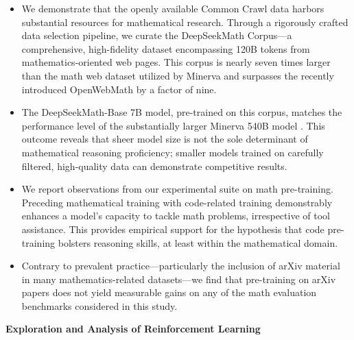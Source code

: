 \begin{itemize}[topsep=0pt]
    \item We demonstrate that the openly available Common Crawl data harbors substantial resources for mathematical research. Through a rigorously crafted data selection pipeline, we curate the DeepSeekMath Corpus—a comprehensive, high-fidelity dataset encompassing 120B tokens from mathematics-oriented web pages. This corpus is nearly seven times larger than the math web dataset utilized by Minerva \citep{minerva} and surpasses the recently introduced OpenWebMath \citep{openwebmath} by a factor of nine.

    \item The DeepSeekMath-Base 7B model, pre-trained on this corpus, matches the performance level of the substantially larger Minerva 540B model \citep{minerva}. This outcome reveals that sheer model size is not the sole determinant of mathematical reasoning proficiency; smaller models trained on carefully filtered, high-quality data can demonstrate competitive results.

    \item We report observations from our experimental suite on math pre-training. Preceding mathematical training with code-related training demonstrably enhances a model’s capacity to tackle math problems, irrespective of tool assistance. This provides empirical support for the hypothesis that code pre-training bolsters reasoning skills, at least within the mathematical domain.

    \item Contrary to prevalent practice—particularly the inclusion of arXiv material in many mathematics-related datasets—we find that pre-training on arXiv papers does not yield measurable gains on any of the math evaluation benchmarks considered in this study.
\end{itemize}

\textbf{Exploration and Analysis of Reinforcement Learning}

